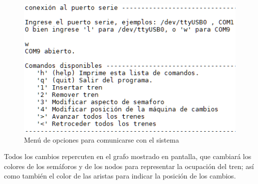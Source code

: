 		\begin{figure}[h]
		\centering
		\includegraphics[scale=.76]{./Figures/Test/UART_2}
			\caption{Menú de opciones para comunicarse con el sistema}
			\label{fig:Menu_UART}
		\end{figure}
	
	\vspace{5cm}
	
	Todos los cambios repercuten en el grafo mostrado en pantalla, que cambiará los colores de los semáforos y de los nodos para representar la ocupación del tren; así como también el color de las aristas para indicar la posición de los cambios.

